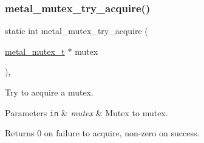 \subsubsection{\texorpdfstring{metal\+\_\+mutex\+\_\+try\+\_\+acquire()}{metal\_mutex\_try\_acquire()}}
{\footnotesize\ttfamily static int metal\+\_\+mutex\+\_\+try\+\_\+acquire (\begin{DoxyParamCaption}\item[{\hyperlink{structmetal__mutex__t}{metal\+\_\+mutex\+\_\+t} $\ast$}]{mutex }\end{DoxyParamCaption})\hspace{0.3cm}{\ttfamily [inline]}, {\ttfamily [static]}}



Try to acquire a mutex. 


\begin{DoxyParams}[1]{Parameters}
\mbox{\tt in}  & {\em mutex} & Mutex to mutex. \\
\hline
\end{DoxyParams}
\begin{DoxyReturn}{Returns}
0 on failure to acquire, non-\/zero on success. 
\end{DoxyReturn}

